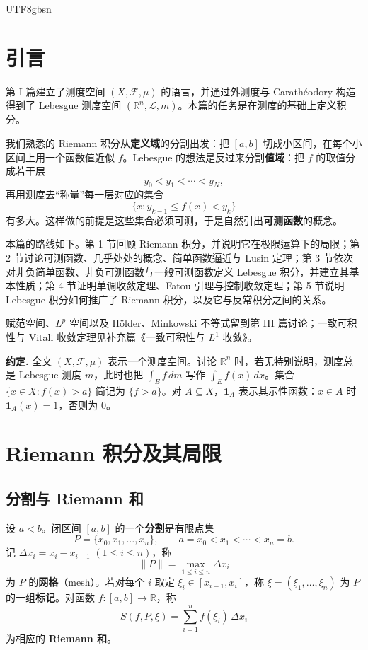 \documentclass[11pt]{article}
\begin{document}
\begin{CJK*}{UTF8}{gbsn}

\maketitle

\section*{引言}

第 I 篇建立了测度空间 $(X,\mathcal{F},\mu)$ 的语言，并通过外测度与 Carathéodory 构造得到了 Lebesgue 测度空间 $(\mathbb{R}^{n},\mathcal{L},m)$。本篇的任务是在测度的基础上定义积分。

我们熟悉的 Riemann 积分从\textbf{定义域}的分割出发：把 $[a,b]$ 切成小区间，在每个小区间上用一个函数值近似 $f$。Lebesgue 的想法是反过来分割\textbf{值域}：把 $f$ 的取值分成若干层
\[
y_{0}<y_{1}<\cdots<y_{N},
\]
再用测度去“称量”每一层对应的集合
\[
\{x:y_{k-1}\leq f(x)<y_{k}\}
\]
有多大。这样做的前提是这些集合必须可测，于是自然引出\textbf{可测函数}的概念。

本篇的路线如下。第 1 节回顾 Riemann 积分，并说明它在极限运算下的局限；第 2 节讨论可测函数、几乎处处的概念、简单函数逼近与 Lusin 定理；第 3 节依次对非负简单函数、非负可测函数与一般可测函数定义 Lebesgue 积分，并建立其基本性质；第 4 节证明单调收敛定理、Fatou 引理与控制收敛定理；第 5 节说明 Lebesgue 积分如何推广了 Riemann 积分，以及它与反常积分之间的关系。

赋范空间、$L^{p}$ 空间以及 Hölder、Minkowski 不等式留到第 III 篇讨论；一致可积性与 Vitali 收敛定理见补充篇《一致可积性与 $L^{1}$ 收敛》。

\textbf{约定.} 全文 $(X,\mathcal{F},\mu)$ 表示一个测度空间。讨论 $\mathbb{R}^{n}$ 时，若无特别说明，测度总是 Lebesgue 测度 $m$，此时也把 $\int_{E}f\,dm$ 写作 $\int_{E}f(x)\,dx$。集合 $\{x\in X:f(x)>a\}$ 简记为 $\{f>a\}$。对 $A\subseteq X$，$\mathbf{1}_{A}$ 表示其示性函数：$x\in A$ 时 $\mathbf{1}_{A}(x)=1$，否则为 $0$。

\section{Riemann 积分及其局限}

\subsection{分割与 Riemann 和}

\begin{definition}
设 $a<b$。闭区间 $[a,b]$ 的一个\textbf{分割}是有限点集
\[
P=\{x_{0},x_{1},\ldots,x_{n}\},\qquad a=x_{0}<x_{1}<\cdots<x_{n}=b.
\]
记 $\Delta x_{i}=x_{i}-x_{i-1}$ $(1\leq i\leq n)$，称
\[
\|P\|=\max_{1\leq i\leq n}\Delta x_{i}
\]
为 $P$ 的\textbf{网格}（mesh）。若对每个 $i$ 取定 $\xi_{i}\in[x_{i-1},x_{i}]$，称 $\xi=(\xi_{1},\ldots,\xi_{n})$ 为 $P$ 的一组\textbf{标记}。对函数 $f:[a,b]\to\mathbb{R}$，称
\[
S(f,P,\xi)=\sum_{i=1}^{n}f(\xi_{i})\,\Delta x_{i}
\]
为相应的 \textbf{Riemann 和}。
\end{definition}


\end{CJK*}
\end{document}
